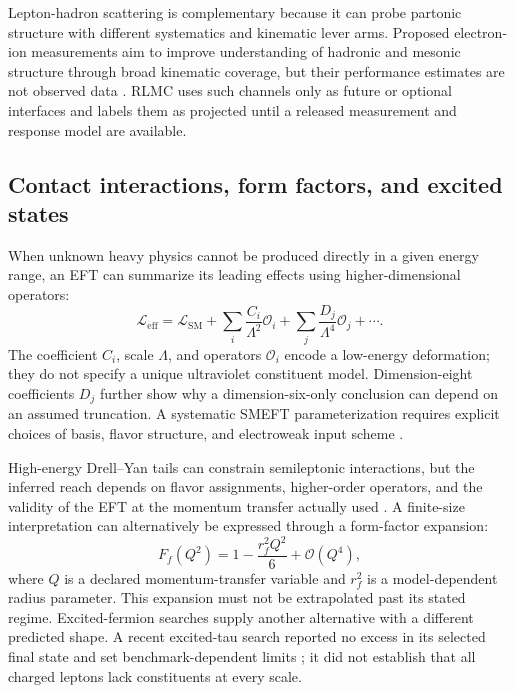 \documentclass[conference]{../../../../Conference-LaTeX-template_10-17-19/IEEEtran}
\begin{document}
Lepton-hadron scattering is complementary because it can probe partonic structure with different systematics and kinematic lever arms. Proposed electron-ion measurements aim to improve understanding of hadronic and mesonic structure through broad kinematic coverage, but their performance estimates are not observed data \cite{arrington2021}. RLMC uses such channels only as future or optional interfaces and labels them as projected until a released measurement and response model are available.

\subsection{Contact interactions, form factors, and excited states}

When unknown heavy physics cannot be produced directly in a given energy range, an EFT can summarize its leading effects using higher-dimensional operators:
\begin{equation}
\mathcal{L}_{\mathrm{eff}}=\mathcal{L}_{\mathrm{SM}}+
\sum_{i}\frac{C_i}{\Lambda^2}\mathcal{O}_i+
\sum_{j}\frac{D_j}{\Lambda^4}\mathcal{O}_j+\cdots .
\label{eq:eft}
\end{equation}
The coefficient $C_i$, scale $\Lambda$, and operators $\mathcal{O}_i$ encode a low-energy deformation; they do not specify a unique ultraviolet constituent model. Dimension-eight coefficients $D_j$ further show why a dimension-six-only conclusion can depend on an assumed truncation. A systematic SMEFT parameterization requires explicit choices of basis, flavor structure, and electroweak input scheme \cite{brivio2017}.

High-energy Drell--Yan tails can constrain semileptonic interactions, but the inferred reach depends on flavor assignments, higher-order operators, and the validity of the EFT at the momentum transfer actually used \cite{allwicher2023}. A finite-size interpretation can alternatively be expressed through a form-factor expansion:
\begin{equation}
F_f(Q^2)=1-\frac{r_f^2 Q^2}{6}+\mathcal{O}(Q^4),
\label{eq:formfactor}
\end{equation}
where $Q$ is a declared momentum-transfer variable and $r_f^2$ is a model-dependent radius parameter. This expansion must not be extrapolated past its stated regime. Excited-fermion searches supply another alternative with a different predicted shape. A recent excited-tau search reported no excess in its selected final state and set benchmark-dependent limits \cite{cms_tau2025}; it did not establish that all charged leptons lack constituents at every scale.
\end{document}
